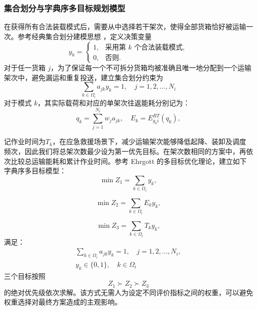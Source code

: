 \subsubsection{集合划分与字典序多目标规划模型}
在获得所有合法装载模式后，需要从中选择若干架次，使得全部货箱恰好被运输一次。参考经典集合划分建模思想 \cite{balinski1965integer}，定义决策变量
\begin{equation}
	y_k = \begin{cases} 1, & \text{采用第 } k \text{ 个合法装载模式}, \\ 0, & \text{否则}. \end{cases}
\end{equation} 
对于任一货箱 $j$，为了保证每一个不可拆分货箱均被准确且唯一地分配到一个运输架次中，避免漏运和重复投送，建立集合划分约束为
\begin{equation}\label{16}
	\sum_{k \in \Omega_i} a_{jk} y_k = 1, \quad j = 1, 2, \dots, N_i
\end{equation} 
对于模式 $k$，其实际载荷和对应的单架次往返能耗分别记为：
\begin{equation}
	q_k = \sum_{j=1}^{N_i} w_j a_{jk},\quad E_k = E_{g_k i}^{RT}(q_k),
\end{equation} 

记作业时间为$T_k$，在应急救援场景下，减少运输架次能够降低起降、装卸及调度频次，因此我们将总架次数最少设为第一优先目标。在架次数相同的方案中，再依次比较总运输能耗和累计作业时间。参考 Ehrgott \cite{ehrgott2005multicriteria} 的多目标优化理论，建立如下字典序多目标模型： 
\begin{equation}
	\min Z_1 = \sum_{k \in \Omega_i} y_k,
\end{equation} 

\begin{equation}
	\min Z_2 = \sum_{k \in \Omega_i} E_k y_k,
\end{equation} 

\begin{equation}
	\min Z_3 = \sum_{k \in \Omega_i} T_k y_k, 
\end{equation} 
满足：
\begin{equation}
	\begin{aligned}
		\sum_{k \in \Omega_i} a_{jk} y_k = 1, \quad j = 1, 2, \dots, N_i,\\ 
		y_k \in \{0, 1\}, \quad k \in \Omega_i
	\end{aligned}
\end{equation} 
三个目标按照
\begin{equation}
	Z_1 \succ Z_2 \succ Z_3
\end{equation} 
的绝对优先级依次求解。该方式无需人为设定不同评价指标之间的权重，可以避免权重选择对最终方案造成的主观影响。

